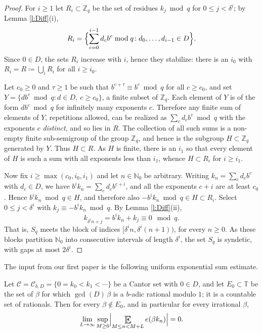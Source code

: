 \begin{proof}
For $i \geq 1$ let $R_i \subset \mathbb Z_q$ be the set of residues $k_j \bmod q$ for $0 \leq j < \delta ^{i}$; 
by Lemma \ref{l:Diff}(i), 
\begin{equation}
R_i = \Bigl\{ \sum_{c=0}^{i-1} d_c b ^{c} \bmod q \colon d_0 , \ldots, d_{i-1} \in D \Bigr\} . 
\end{equation}
Since $0 \in D$, the sets $R_i$ increase with $i$, hence  they stabilize: there is an $i_0$ with $R_i = R \coloneqq \bigcup_{i} R_i$ for all $i \geq i_0$.  

Let $c_0 \geq 0$ and $\tau \geq 1$ be such that $b ^{c+\tau} \equiv b ^{c} \bmod q$ for all $c \geq c_0$, and set 
$Y= \{ d b ^{c} \bmod q \colon d \in D ,\ c \geq c_0\}$, a finite subset of $\mathbb Z_q$.  
Each element of $Y$ is of the form $db ^{c} \bmod q$ for infinitely many exponents $c$.  
Therefore any finite sum of elements of $Y$, repetitions allowed, can be realized as 
$\sum_{c} d_c b ^{c} \bmod q$ with the exponents $c$ \emph{distinct}, and so lies in $R$.  
The collection of all such sums is a non-empty finite sub-semigroup of the group $\mathbb Z_q$, and hence is the subgroup $H \subset \mathbb Z_q$ generated by $Y$.  
Thus $H \subset R$.  As $H$ is finite, there is an $i_1$ so that every element of $H$ is such a sum with all exponents less than $i_1$, whence $H \subset R_i$ for $i \geq i_1$.  

Now fix $i \geq \max (c_0 , i_0 , i_1)$ and let $n \in \mathbb N_0$ be arbitrary.  
Writing $k_n = \sum_{c} d_c b ^{c}$ with $d_c \in D$, we have $b ^{i} k_n = \sum_{c} d_c b ^{c+i}$, and all the exponents $c+i$ are at least $c_0$.  
Hence $b ^{i} k_n \bmod q \in H$, and therefore also $- b ^{i} k_n \bmod q \in H \subset R_i$.  
Select $0 \leq j < \delta ^{i}$ with $k_j \equiv - b ^{i} k_n \bmod q$.  By Lemma \ref{l:Diff}(ii), 
\begin{equation}
k _{\delta ^{i} n+j} = b ^{i} k_n + k_j \equiv 0 \mod q . 
\end{equation}
That is, $S_q$ meets the block of indices $[\delta ^{i} n , \delta ^{i}(n+1))$, for every $n \geq 0$.  
As these blocks partition $\mathbb N_0$ into consecutive intervals of length $\delta ^{i}$, the set $S_q$ is syndetic, with gaps at most $2 \delta ^{i}$.  
\end{proof}


The input from our first paper is the following uniform exponential sum estimate.  

\begin{lemma} \label{l:irrational}
Let $\mathcal C = \mathcal C_{b,D} = \{0=k_0<k_1 < \cdots\}$ be a Cantor set with $0\in D$, and let 
$E_0 \subset \mathbb T$ be the set of $\beta$ for which $\gcd(D)\, \beta$ is a $b$-adic rational modulo $1$; it is a countable set of rationals.  
Then for every $\beta \notin E_0$, and in particular for every irrational $\beta$, 
\begin{equation} \label{e:irrationalUniform}
\lim_{L\to\infty} \sup_{M \geq 0} \Bigl\lvert \Expectation_{M\leq n<M+L} e ( \beta k_n) \Bigr\rvert =0 . 
\end{equation}
\end{lemma}

